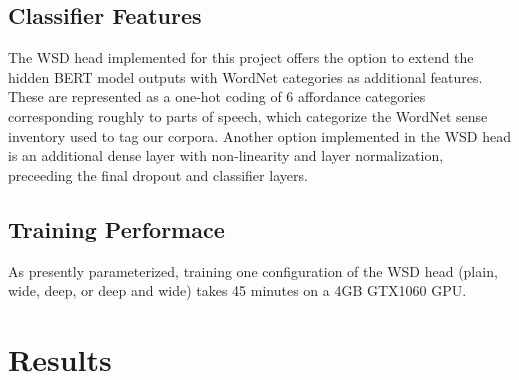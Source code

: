 \documentclass{IEEEtran}
\begin{document}
\subsection{Classifier Features}
	The WSD head implemented for this project offers the option to extend the hidden BERT model outputs with WordNet categories as additional features.  These are represented as a one-hot coding of 6 affordance categories corresponding roughly to parts of speech, which categorize the WordNet sense inventory used to tag our corpora.  Another option implemented in the WSD head is an additional dense layer with non-linearity and layer normalization, preceeding the final dropout and classifier layers.  
\subsection{Training Performace}
	As presently parameterized, training one configuration of the WSD head (plain, wide, deep, or deep and wide) takes 45 minutes on a 4GB GTX1060 GPU.        
\section{Results}
\end{document}
